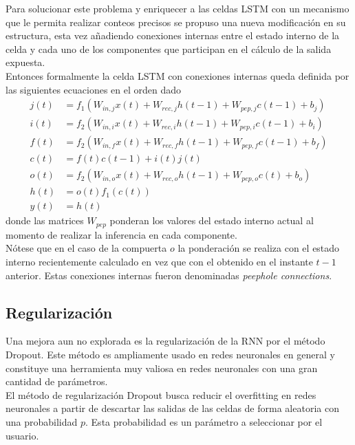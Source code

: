\documentclass{article}
\begin{document}
	Para solucionar este problema y enriquecer a las celdas LSTM con un mecanismo que le permita realizar conteos precisos se propuso una nueva modificación en su estructura, esta vez añadiendo conexiones internas entre el estado interno de la celda y cada uno de los componentes que participan en el cálculo de la salida expuesta.\\
	Entonces formalmente la celda LSTM con conexiones internas queda definida por las siguientes ecuaciones en el orden dado
	\begin{equation*}
	\begin{split}
	j(t) &= f_1(W_{in, j} x(t) + W_{rec, j} h(t-1) + W_{pep, j} c(t-1) + b_{j})\\
	i(t) &= f_2(W_{in, i} x(t) + W_{rec, i} h(t-1) + W_{pep, i} c(t-1) + b_{i})\\
	f(t) &= f_2(W_{in, f} x(t) + W_{rec, f} h(t-1) + W_{pep, f} c(t-1) + b_f)\\
	c(t) &= f(t)c(t-1) + i(t)j(t)\\
	o(t) &= f_2(W_{in, o} x(t) + W_{rec, o} h(t-1) + W_{pep, o} c(t) + b_o)\\
	h(t) &= o(t)f_1(c(t))\\
	y(t) &= h(t)
	\end{split}
	\end{equation*}
	donde las matrices $W_{pep}$ ponderan los valores del estado interno actual al momento de realizar la inferencia en cada componente.\\
	Nótese que en el caso de la compuerta $o$ la ponderación se realiza con el estado interno recientemente calculado en vez que con el obtenido en el instante $t-1$ anterior.	Estas conexiones internas fueron denominadas \textit{peephole connections}.
	
	\subsection{Regularización}
	Una mejora aun no explorada es la regularización de la RNN por el método Dropout. Este método es ampliamente usado en redes neuronales en general y constituye una herramienta muy valiosa en redes neuronales con una gran cantidad de parámetros.\\
	El método de regularización Dropout busca reducir el overfitting en redes neuronales a partir de descartar las salidas de las celdas de forma aleatoria con una probabilidad $p$. Esta probabilidad es un parámetro a seleccionar por el usuario.\\
	
\end{document}
